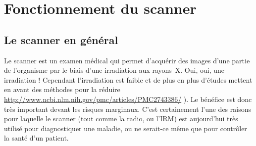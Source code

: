 \documentclass[main.tex]{subfiles}
\begin{document}
%

\section{Fonctionnement du scanner}
\subsection{Le scanner en général}
Le scanner est un examen médical qui permet d'acquérir des images d'une partie de l'organisme par le biais d'une irradiation aux rayons~X. Oui, oui, une irradiation ! Cependant l'irradiation est faible et de plus en plus d'études mettent en avant des méthodes pour la réduire  \url{http://www.ncbi.nlm.nih.gov/pmc/articles/PMC2743386/} ). Le bénéfice est donc très important devant les risques marginaux. C'est certainement l'une des raisons pour laquelle le scanner (tout comme la radio, ou l'IRM) est aujourd'hui très utilisé pour diagnostiquer une maladie, ou ne serait-ce même que pour contrôler la santé d'un patient.
\end{document}
